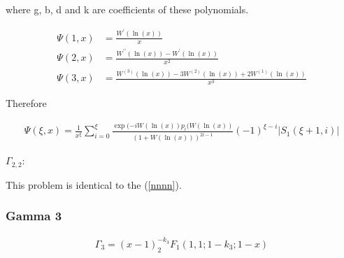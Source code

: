 where g, b, d and k are coefficients of these polynomials. 

\begin{align}
      \Psi(1, x) &=  \frac{W^\prime(\ln(x))}{x} \\
      \Psi(2, x) &=  \frac{W^{\prime\prime}(\ln(x))-W^\prime(\ln(x))}{x^2}\\
      \Psi(3, x) &=\frac{W^{(3)}(\ln(x))-3W^{(2)}(\ln(x))+2W^{(1)}(\ln(x))}{x^3}
\end{align}

Therefore

\begin{align}
      \Psi(\xi, x) = \frac{1}{x^\xi}\sum_{i=0}^\xi \frac{\exp(-iW(\ln(x))
      p_i(W(\ln(x))}{(1+W(\ln(x)))^{2i-1}}(-1)^{\xi-i}|S_1(\xi+1, i)|
\end{align}

\(\Gamma_{2, 2}\):

This problem is identical to the (\ref{nnnn}).

\subsubsection{Gamma 3}

\begin{align}
      \Gamma_3 = (x-1)^{-k_3}_2F_1(1, 1; 1-k_3; 1-x)
\end{align}
